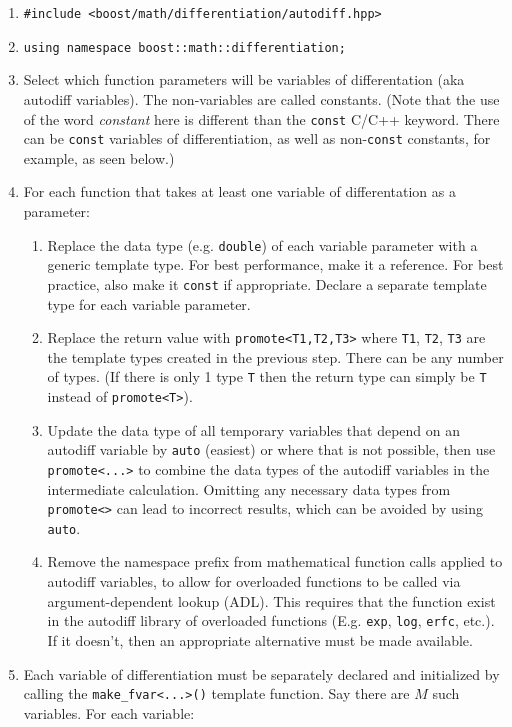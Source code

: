 \documentclass{article}
\begin{document}
\begin{enumerate}
\item {\tt \#include <boost/math/differentiation/autodiff.hpp>}
\item {\tt using namespace boost::math::differentiation;}
\item Select which function parameters will be variables of differentation (aka autodiff variables). The
  non-variables are called constants. (Note that the use of the word {\it constant}\/ here is different than the
  {\tt const} C/C++ keyword. There can be {\tt const} variables of differentiation, as well as non-{\tt const}
  constants, for example, as seen below.)
\item For each function that takes at least one variable of differentation as a parameter:
  \begin{enumerate}
  \item Replace the data type (e.g. {\tt double}) of each variable parameter with a generic template type.
    For best performance, make it a reference. For best practice, also make it {\tt const} if appropriate.
    Declare a separate template type for each variable parameter.
  \item Replace the return value with {\tt promote<T1,T2,T3>} where {\tt T1}, {\tt T2}, {\tt T3} are the template
    types created in the previous step. There can be any number of types. (If there is only 1 type {\tt T} then the
    return type can simply be {\tt T} instead of {\tt promote<T>}).
  \item Update the data type of all temporary variables that depend on an autodiff variable by {\tt auto} (easiest)
    or where that is not possible, then use {\tt promote<...>} to combine the data types of the autodiff variables
    in the intermediate calculation. Omitting any necessary data types from {\tt promote<>} can lead to incorrect
    results, which can be avoided by using {\tt auto}.
  \item Remove the namespace prefix from mathematical function calls applied to autodiff variables, to allow
    for overloaded functions to be called via argument-dependent lookup (ADL). This requires that the function exist
    in the autodiff library of overloaded functions (E.g. {\tt exp}, {\tt log}, {\tt erfc}, etc.). If it doesn't,
    then an appropriate alternative must be made available.
  \end{enumerate}
\item Each variable of differentiation must be separately declared and initialized by calling the
  {\tt make\_fvar<...>()} template function. Say there are $M$ such variables. For each variable:

\end{enumerate}
\end{document}
